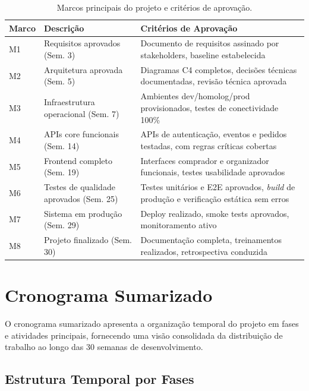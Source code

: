 \begin{table}[H]
\centering
\caption{Marcos principais do projeto e critérios de aprovação.}%
\label{tab:marcos}
\small
\begin{tabular}{|p{1.5cm}|p{5cm}|p{7cm}|}
\hline
\textbf{Marco} & \textbf{Descrição} & \textbf{Critérios de Aprovação} \\ \hline
M1 & Requisitos aprovados (Sem. 3) & Documento de requisitos assinado por stakeholders, baseline estabelecida \\ \hline
M2 & Arquitetura aprovada (Sem. 5) & Diagramas C4 completos, decisões técnicas documentadas, revisão técnica aprovada \\ \hline
M3 & Infraestrutura operacional (Sem. 7) & Ambientes dev/homolog/prod provisionados, testes de conectividade 100\% \\ \hline
M4 & APIs core funcionais (Sem. 14) & APIs de autenticação, eventos e pedidos testadas, com regras críticas cobertas \\ \hline
M5 & Frontend completo (Sem. 19) & Interfaces comprador e organizador funcionais, testes usabilidade aprovados \\ \hline
M6 & Testes de qualidade aprovados (Sem. 25) & Testes unitários e E2E aprovados, \textit{build} de produção e verificação estática sem erros \\ \hline
M7 & Sistema em produção (Sem. 29) & Deploy realizado, smoke tests aprovados, monitoramento ativo \\ \hline
M8 & Projeto finalizado (Sem. 30) & Documentação completa, treinamentos realizados, retrospectiva conduzida \\ \hline
\end{tabular}
\end{table}

\section{Cronograma Sumarizado}

O cronograma sumarizado apresenta a organização temporal do projeto em fases e atividades principais, fornecendo uma visão consolidada da distribuição de trabalho ao longo das 30 semanas de desenvolvimento.

\subsection{Estrutura Temporal por Fases}

